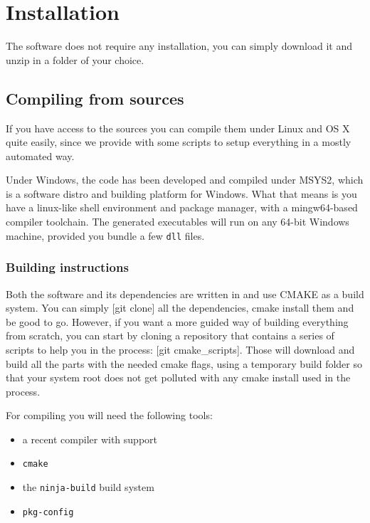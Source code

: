 \chapter{Installation}
The software does not require any installation, you can simply download it
and unzip in a folder of your choice. 

\section{Compiling from sources}

If you have access to the sources you can compile them under Linux and OS X
quite easily, since we provide with some scripts to setup everything
in a mostly automated way.

Under Windows, the code has been developed and compiled under MSYS2, which
is a software distro and building platform for Windows. What that means is
you have a linux-like shell environment and package manager, with a
mingw64-based compiler toolchain. The generated executables will run
on any 64-bit Windows machine, provided you bundle a few \texttt{dll} files.

\subsection{Building instructions}
Both the software and its dependencies are written in \CC{} and use CMAKE as a
build system. You can simply [git clone] all the dependencies, cmake install
them and be good to go.
However, if you want a more guided way of building everything from scratch,
you can start by cloning a repository that contains a series of scripts to help
you in the process: [git cmake\_scripts]. Those will download and build
all the parts with the needed cmake flags, using a temporary build folder
so that your system root does not get polluted with any cmake install used
in the process.

For compiling you will need the following tools:
\begin{itemize}
    \item a recent compiler with  support
    \item \texttt{cmake}
    \item the \texttt{ninja-build} build system
    \item \texttt{pkg-config}
\end{itemize}

